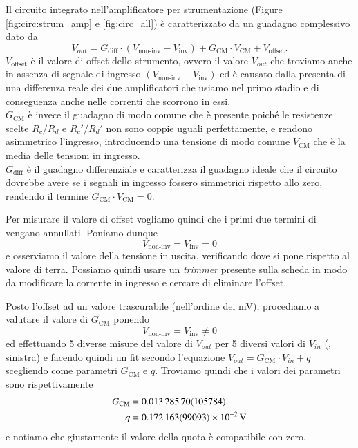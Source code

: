 \documentclass[
    rmp,
    reprint, 
    superscriptaddress, 
    altaffilletter, 
    amsmath, 
    amssymb,
    a4paper]{revtex4-2}
\begin{document}
Il circuito integrato nell'amplificatore per strumentazione (Figure \ref{fig:circ:strum_amp} e \ref{fig:circ_all}) è caratterizzato da un guadagno complessivo dato da \begin{equation}V_{out} = G_{\text{diff}}\cdot \left(V_{\text{non-inv}}-V_{\text{inv}}\right) +  G_{\text{CM}}\cdot V_{\text{CM}} + V_{\text{offset}}.\label{eq:V_out=GtotVin}\end{equation}
$V_{\text{offset}}$ è il valore di offset dello strumento, ovvero il valore $V_{out}$ che troviamo anche in assenza di segnale di ingresso $\left(V_{\text{non-inv}}-V_{\text{inv}}\right)$ ed è causato dalla presenta di una differenza reale dei due amplificatori che usiamo nel primo stadio e di conseguenza anche nelle correnti che scorrono in essi.\\
$G_{\text{CM}}$ è invece il guadagno di modo comune che è presente poiché le resistenze scelte $R_c/R_d$ e $R_c'/R_d'$ non sono coppie uguali perfettamente, e rendono asimmetrico l'ingresso, introducendo una tensione di modo comune $V_{\text{CM}}$ che è la media delle tensioni in ingresso.\\
$G_{\text{diff}}$ è il guadagno differenziale e caratterizza il guadagno ideale che il circuito dovrebbe avere se i segnali in ingresso fossero simmetrici rispetto allo zero, rendendo il termine $G_{\text{CM}}\cdot V_{\text{CM}} = 0$. 

Per misurare il valore di offset vogliamo quindi che i primi due termini di  vengano annullati. Poniamo dunque \[V_{\text{non-inv}}=V_{\text{inv}}=0\] e osserviamo il valore della tensione in uscita, verificando dove si pone rispetto al valore di terra.
Possiamo quindi usare un \emph{trimmer} presente sulla scheda in modo da modificare la corrente in ingresso e cercare di eliminare l'offset.

Posto l'offset ad un valore trascurabile (nell'ordine dei \unit{\milli\volt}), procediamo a valutare il valore di $G_{\text{CM}}$ ponendo \[V_{\text{non-inv}}=V_{\text{inv}}\neq0\]
ed effettuando 5 diverse misure del valore di $V_{out}$ per 5 diversi valori di $V_{in}$ (, sinistra) e facendo quindi un fit secondo l'equazione $V_{out}=G_{\text{CM}}\cdot V_{in}+q$ scegliendo come parametri $G_{\text{CM}}$ e $q$. Troviamo quindi che i valori dei parametri sono rispettivamente
\begin{align*}
    G_{\text{CM}} &=\num{0.0132857+-0.00105784} \\
    q &=\SI{0.172163+-0.099093e-2}{\volt} \\
\end{align*}
e notiamo che giustamente il valore della quota è compatibile con zero.
\end{document}
